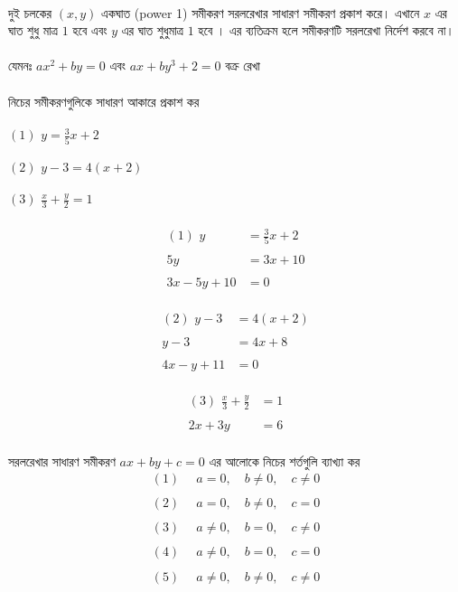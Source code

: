 \documentclass{article}
\begin{document}
		\\
		দুই চলকের $(x,y)$ একঘাত (power 1) সমীকরণ সরলরেখার সাধারণ সমীকরণ প্রকাশ করে। এখানে $x$ এর ঘাত শুধু  মাত্র $1$ হবে  এবং $y$ এর ঘাত শুধুমাত্র $1$ হবে । এর ব্যতিক্রম হলে সমীকরণটি সরলরেখা নির্দেশ করবে না। \\
		\\ 
		যেমনঃ $ax^2+by=0$ এবং  $ax+by^3+2=0$ বক্র রেখা \\ 
		\\
	নিচের সমীকরণগুলিকে সাধারণ আকারে প্রকাশ কর\\
	\\
	$(1)\,\,y=\frac{3}{5}x+2$\\
	\\
	$(2)\,\,y-3=4(x+2)$\\
	\\ 
	$(3)\,\,\frac{x}{3}+\frac{y}{2}=1$\\
	\\ 
	\begin{align*}
	(1)\,\,y&=\frac{3}{5}x+2\\
	\\
	5y&=3x+10\\
	\\
	3x-5y+10&=0
	\end{align*}
\\
\begin{align*}
(2)\,\,y-3&=4(x+2)\\
\\
y-3&=4x+8\\
\\
4x-y+11&=0
\end{align*}
\\
\begin{align*}
(3)\,\,\frac{x}{3}+\frac{y}{2}&=1\\
\\
2x+3y&=6
\end{align*}
\\
সরলরেখার সাধারণ সমীকরণ	$ax+by+c=0$ এর আলোকে নিচের শর্তগুলি ব্যাখ্যা কর \\ 
	\begin{align*}
		(1)\,\,\,& a=0,\quad b\ne 0,\quad c\ne 0\\
		\\
		(2)\,\,\, & a=0,\quad b\ne 0,\quad c=0\\
		\\
		(3)\,\,\,& a\ne 0,\quad b=0,\quad c\ne 0\\
		\\
		(4)\,\,\, & a\ne 0, \quad b=0, \quad c=0\\
		\\
			(5)\,\,\, & a\ne 0, \quad b\ne 0, \quad c \ne 0
	\end{align*}
\end{document}
